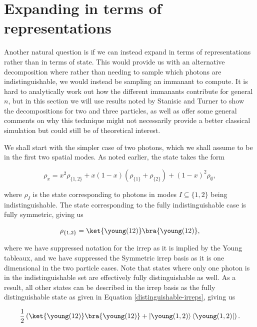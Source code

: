 \section{Expanding in terms of representations}

Another natural question is if we can instead expand in terms of representations rather than in terms of state. This would provide us with an alternative decomposition where rather than needing to sample which photons are indistinguishable, we would instead be sampling an immanant to compute. It is hard to analytically work out how the different immanants contribute for general $n$, but in this section we will use results noted by Stanisic and Turner \cite{stanisic2018} to show the decompositions for two and three particles, as well as offer some general comments on why this technique might not necessarily provide a better classical simulation but could still be of theoretical interest.

We shall start with the simpler case of two photons, which we shall assume to be in the first two spatial modes. As noted earlier, the state takes the form

\begin{equation}
\rho_x = x^2\rho_{\{1,2\}} + x(1-x)(\rho_{\{1\}} + \rho_{\{2\}}) + (1-x)^2\rho_{\emptyset},
\end{equation}

\noindent where $\rho_I$ is the state corresponding to photons in modes $I\subseteq\{1,2\}$ being indistinguishable. The state corresponding to the fully indistinguishable case is fully symmetric, giving us

\begin{equation}
\rho_{\{1,2\}} = \ket{\young(12)}\bra{\young(12)},
\end{equation}

\noindent where we have suppressed notation for the irrep as it is implied by the Young tableaux, and we have suppressed the Symmetric irrep basis as it is one dimensional in the two particle cases. Note that states where only one photon is in the indistinguishable set are effectively fully distinguishable as well. As a result, all other states can be described in the irrep basis as the fully distinguishable state as given in Equation \ref{distinguishable-irreps}, giving us

\begin{equation}
\frac{1}{2}\left(\ket{\young(12)}\bra{\young(12)}+\left|\young(1,2)\right\rangle\left\langle\young(1,2)\right|\right).
\end{equation}

